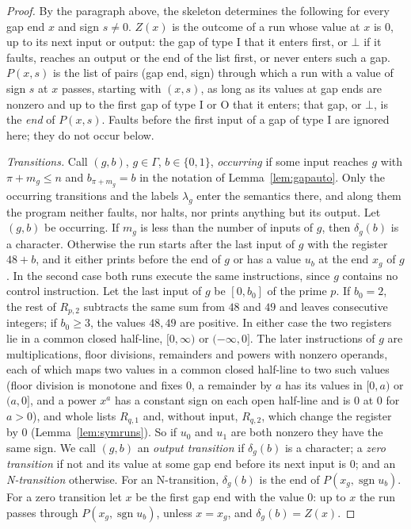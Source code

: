 \documentclass[11pt]{article}
\theoremstyle{remark}
\begin{document}
\begin{proof}
By the paragraph above, the skeleton determines the following for every gap end $x$ and
sign $s\ne0$.  $Z(x)$ is the outcome of a run whose value at $x$ is $0$, up to its next
input or output: the gap of type $\mathrm I$ that it enters first, or $\bot$ if it faults,
reaches an output or the end of the list first, or never enters such a gap.  $P(x,s)$ is the list
of pairs (gap end, sign) through which a run with a value of sign $s$ at $x$ passes,
starting with $(x,s)$, as long as its values at gap ends are nonzero and up to the first
gap of type $\mathrm I$ or $\mathrm O$ that it enters; that gap, or $\bot$, is the
\emph{end} of $P(x,s)$.  Faults before the first input of a gap of type $\mathrm I$ are
ignored here; they do not occur below.

\emph{Transitions.}  Call $(g,b)$, $g\in\Gamma$, $b\in\{0,1\}$, \emph{occurring} if some
input reaches $g$ with $\pi+m_g\le n$ and $b_{\pi+m_g}=b$ in the notation of
Lemma~\ref{lem:gapauto}.  Only the occurring transitions and the labels $\lambda_g$ enter
the semantics there, and along them the program neither faults, nor halts, nor prints
anything but its output.  Let $(g,b)$ be occurring.  If $m_g$ is less than the number of
inputs of $g$, then $\delta_g(b)$ is a character.  Otherwise the run starts after the last
input of $g$ with the register $48+b$, and it either prints before the end of $g$ or has a
value $u_b$ at the end $x_g$ of $g$.  In the second case both runs execute the same
instructions, since $g$ contains no control instruction.  Let the last input of $g$ be
$[0,b_0]$ of the prime $p$.  If $b_0=2$, the rest of $R_{p,2}$ subtracts the same sum
from $48$ and $49$ and leaves consecutive integers; if $b_0\ge3$, the values $48,49$ are
positive.  In either case the two registers lie in a common closed half-line,
$[0,\infty)$ or $(-\infty,0]$.  The later instructions of $g$ are multiplications,
floor divisions, remainders and powers with nonzero operands, each of which maps two
values in a common closed half-line to two such values (floor division is monotone and
fixes $0$, a remainder by $a$ has its values in $[0,a)$ or $(a,0]$, and a power $x^a$ has
a constant sign on each open half-line and is $0$ at $0$ for $a>0$), and whole lists $R_{q,1}$ and, without input, $R_{q,2}$, which
change the register by $0$ (Lemma~\ref{lem:symruns}).  So if $u_0$ and $u_1$ are both
nonzero they have the same sign.  We
call $(g,b)$ an \emph{output transition} if $\delta_g(b)$ is a character; a \emph{zero
transition} if not and its value at some gap end before its next input is $0$; and an
\emph{N-transition} otherwise.  For an N-transition, $\delta_g(b)$ is the end of
$P(x_g,\operatorname{sgn}u_b)$.  For a zero transition let $x$ be the first gap end with the
value $0$: up to $x$ the run passes through $P(x_g,\operatorname{sgn}u_b)$, unless
$x=x_g$, and $\delta_g(b)=Z(x)$.


\end{proof}
\end{document}

